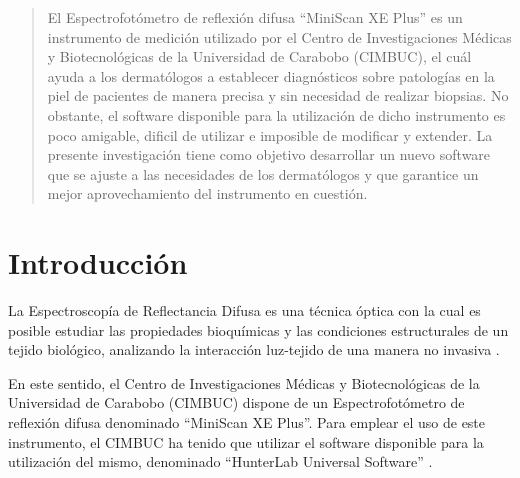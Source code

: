\documentclass[conference]{IEEEtran}
\begin{document}
\begin{abstract}
El Espectrofot\'{o}metro de reflexi\'{o}n difusa ``MiniScan XE Plus'' es un instrumento de medici\'{o}n utilizado por el Centro de Investigaciones M\'{e}dicas y Biotecnol\'{o}gicas de la Universidad de Carabobo (CIMBUC), el cu\'{a}l ayuda a los dermat\'{o}logos a establecer diagn\'{o}sticos sobre patolog\'{i}as en la piel de pacientes de manera precisa y sin necesidad de realizar biopsias. No obstante, el software disponible para la utilizaci\'{o}n de dicho instrumento es poco amigable, dificil de utilizar e imposible de modificar y extender. La presente investigaci\'{o}n tiene como objetivo desarrollar un nuevo software que se ajuste a las necesidades de los dermat\'{o}logos y que garantice un mejor aprovechamiento del instrumento en cuesti\'{o}n.
\end{abstract}





%
\IEEEpeerreviewmaketitle

\section{Introducci\'{o}n}

La Espectroscop\'{i}a de Reflectancia Difusa es una t\'{e}cnica \'{o}ptica con la cual es  posible estudiar las propiedades bioqu\'{i}micas y las condiciones estructurales de un tejido biol\'{o}gico, analizando la interacci\'{o}n luz-tejido de una manera no invasiva \cite{Perez}.

En este sentido, el Centro de Investigaciones M\'{e}dicas y Biotecnol\'{o}gicas de la Universidad de Carabobo (CIMBUC) dispone de un Espectrofot\'{o}metro de reflexi\'{o}n difusa denominado ``MiniScan XE Plus''. Para emplear el uso de este instrumento, el CIMBUC ha tenido que utilizar el software disponible para la utilizaci\'{o}n del mismo, denominado ``HunterLab Universal Software'' \cite{HunterLab-manual}.
\end{document}
